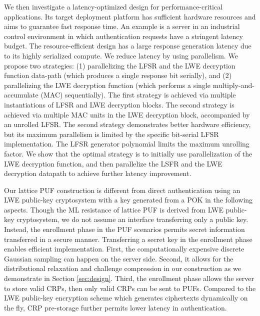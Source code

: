 We then investigate a latency-optimized design for performance-critical applications. 
Its target deployment platform has sufficient hardware resources and aims to guarantee fast response time. 
An example is a server in an industrial control environment in which authentication requests have a stringent latency budget. 
The resource-efficient design has a large response generation latency due to its highly serialized compute. 
We reduce latency by using parallelism. 
We propose two strategies: (1) parallelizing the LFSR and the LWE decryption function data-path (which produces a single response bit serially), and (2) parallelizing the LWE decryption function (which performs a single multiply-and-accumulate (MAC) sequentially). 
The first strategy is achieved via multiple instantiations of LFSR and LWE decryption blocks. 
The second strategy is achieved via multiple MAC units in the LWE decryption block, accompanied by an unrolled LFSR. 
The second strategy demonstrates better hardware efficiency, but its maximum parallelism is limited by the specific bit-serial LFSR implementation. 
The LFSR generator polynomial limits the maximum unrolling factor. 
We show that the optimal strategy is to initially use parallelization of the LWE decryption function, and then parallelize the LSFR and the LWE decryption datapath to achieve further latency improvement.

Our lattice PUF construction is different from direct authentication using an LWE public-key cryptosystem with a key generated from a POK in the following aspects. 
Though the ML resistance of lattice PUF is derived from LWE public-key cryptosystem, we do not assume an interface transferring only a public key. 
Instead, the enrollment phase in the PUF scenarios permits secret information transferred in a secure manner. 
Transferring a secret key in the enrollment phase enables efficient implementation. 
First, the computationally expensive discrete Gaussian sampling can happen on the server side. 
Second, it allows for the distributional relaxation and challenge compression in our construction as we demonstrate in Section \ref{sec:design}.
Third, the enrollment phase allows the server to store valid CRPs, then only valid CRPs can be sent to PUFs. 
Compared to the LWE public-key encryption scheme which generates ciphertexts dynamically on the fly, CRP pre-storage further permits lower latency in authentication.

